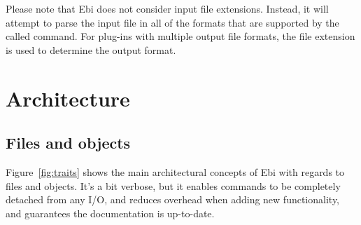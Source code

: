 \documentclass{article}
\begin{document}
    Please note that Ebi does not consider input file extensions.
    Instead, it will attempt to parse the input file in all of the formats that are supported by the called command.
    For plug-ins with multiple output file formats, the file extension is used to determine the output format.
    
    \ebifilehandlers

\clearpage
\section{Architecture}
\label{sec:architecture}

    \subsection{Files and objects}
        Figure~\ref{fig:traits} shows the main architectural concepts of Ebi with regards to files and objects.
        It's a bit verbose, but it enables commands to be completely detached from any I/O, and reduces overhead when adding new functionality, and guarantees the documentation is up-to-date.
    
\end{document}
